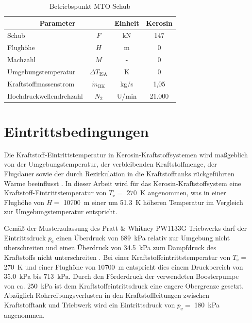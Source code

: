 \begin{table}[ht]
    \centering
	\caption{Betriebspunkt MTO-Schub}
	\begin{tabular} {|l|c|c|c|} \hline%
    \multicolumn{2}{|c|}{Parameter} & Einheit & Kerosin \\ \hline\hline%
    Schub & $F$ & kN & 147 \\ \hline
    Flughöhe & $H$ & m & 0 \\ \hline
    Machzahl & $M$ & - & 0 \\ \hline
    Umgebungstemperatur & $\Delta T_\mathrm{ISA}$ & K & 0 \\ \hline\hline
    Kraftstoffmassenstrom & $\dot{m}_\mathrm{BK}$& kg/s & 1,05  \\ \hline
    Hochdruckwellendrehzahl & $N_2$ & U/min & 21.000 \\ \hline
    \end{tabular}	
    \label{Tab:mto}%
\end{table}
\FloatBarrier 

\section{Eintrittsbedingungen}

Die Kraftstoff-Eintrittstemperatur in Kerosin-Kraftstoffsystemen wird maßgeblich von der Umgebungstemperatur, der verbleibenden Kraftstoffmenge, der Flugdauer sowie der durch Rezirkulation in die Kraftstofftanks rückgeführten Wärme beeinflusst \cite{German.2012}. In dieser Arbeit wird für das Kerosin-Kraftstoffsystem eine Kraftstoff-Eintrittstemperatur von $T_\mathrm{e}=$ \SI{270}{\K} angenommen, was in einer Flughöhe von $H= $ \SI{10700}{\m} einer um \SI{51.3}{\K} höheren Temperatur im Vergleich zur Umgebungstemperatur entspricht. 

Gemäß der Musterzulassung des Pratt \& Whitney PW1133G Triebwerks darf der Eintrittsdruck $p_\mathrm{e}$ einen Überdruck von \SI{689}{\kilo\Pa} relativ zur Umgebung nicht überschreiten und einen Überdruck von \SI{34.5}{\kilo\Pa} zum Dampfdruck des Kraftstoffs nicht unterschreiten \cite{EASA.2018}. Bei einer Kraftstoffeintrittstemperatur von $T_\mathrm{e}=$ \SI{270}{\K} und einer Flughöhe von \SI{10700}{\m} entspricht dies einem Druckbereich von \SI{35.0}{\kilo\Pa} bis \SI{713}{\kilo\Pa}. Durch den Förderdruck der verwendeten Boosterpumpe von ca. \SI{250}{\kilo\Pa} \cite{EatonFuelSystemsDivision.2013} ist dem Kraftstoffeintrittsdruck eine engere Obergrenze gesetzt. Abzüglich Rohrreibungsverlusten in den Kraftstoffleitungen zwischen Kraftstofftank und Triebwerk wird ein Eintrittsdruck von $p_\mathrm{e}=$ \SI{180}{\kilo\Pa} angenommen.

